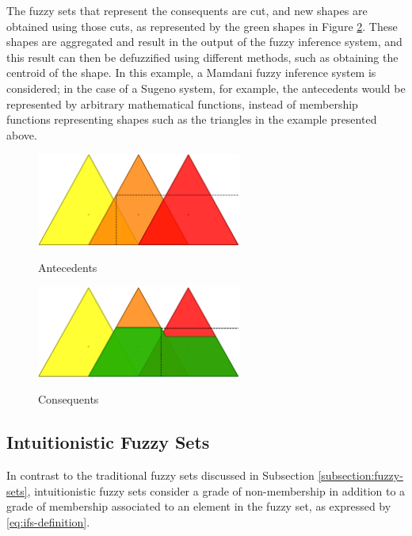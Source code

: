 \documentclass[review]{elsarticle}
\begin{document}
The fuzzy sets that represent the consequents are cut, and new shapes are obtained using those cuts, as represented by the green shapes in Figure \ref{figure:consequents}. These shapes are aggregated and result in the output of the fuzzy inference system, and this result can then be defuzzified using different methods, such as obtaining the centroid of the shape. In this example, a Mamdani fuzzy inference system is considered; in the case of a Sugeno system, for example, the antecedents would be represented by arbitrary mathematical functions, instead of membership functions representing shapes such as the triangles in the example presented above.

\begin{figure}
\caption{Antecedents}
\centering
\includegraphics[width=0.6\textwidth]{img/antecedents.png}
\label{figure:antecedents}
\end{figure}

\begin{figure}
\caption{Consequents}
\centering
\includegraphics[width=0.6\textwidth]{img/consequents.png}
\label{figure:consequents}
\end{figure}

\subsection{Intuitionistic Fuzzy Sets}
\label{subsection:intuitionistic-fuzzy-sets}

In contrast to the traditional fuzzy sets discussed in Subsection \ref{subsection:fuzzy-sets}, intuitionistic fuzzy sets consider a grade of non-membership in addition to a grade of membership associated to an element in the fuzzy set, as expressed by \ref{eq:ifs-definition}.
\end{document}
